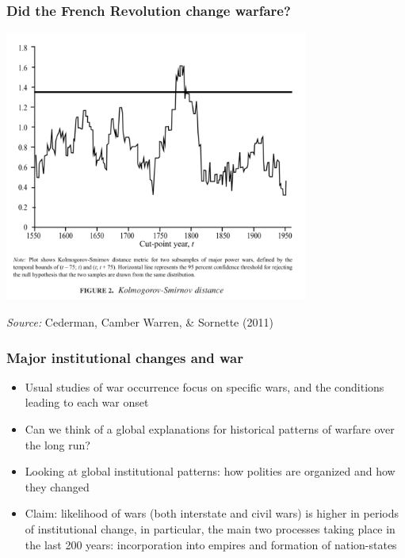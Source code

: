 \documentclass[aspectratio=43]{beamer}
\begin{document}
\begin{frame}
\frametitle{Did the French Revolution change warfare?}
\centering

\includegraphics[width = 0.75\textwidth]{img/cederman_et_al_fig2}

{\scriptsize \textit{Source:} Cederman, Camber Warren, \& Sornette (2011)}

\end{frame}

\begin{frame}
\frametitle{Major institutional changes and war}
\centering

\begin{itemize}[<+->]
  \item Usual studies of war occurrence focus on specific wars, and the conditions leading to each war onset
  \item Can we think of a global explanations for historical patterns of warfare over the long run?
  \item Looking at global institutional patterns: how polities are organized and how they changed
  \item Claim: likelihood of wars (both interstate and civil wars) is higher in periods of institutional change, in particular, the main two processes taking place in the last 200 years: incorporation into empires and formation of nation-states
\end{itemize}

\end{frame}
\end{document}
